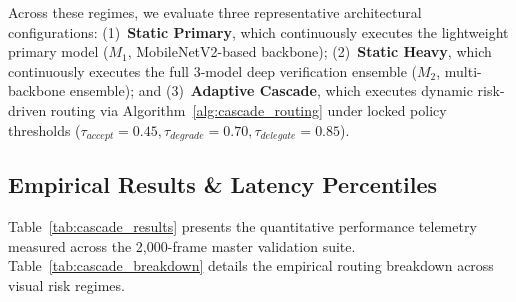 \documentclass[conference]{IEEEtran}
\begin{document}
Across these regimes, we evaluate three representative architectural configurations: (1)~\textbf{Static Primary}, which continuously executes the lightweight primary model ($M_1$, MobileNetV2-based backbone); (2)~\textbf{Static Heavy}, which continuously executes the full 3-model deep verification ensemble ($M_2$, multi-backbone ensemble); and (3)~\textbf{Adaptive Cascade}, which executes dynamic risk-driven routing via Algorithm~\ref{alg:cascade_routing} under locked policy thresholds ($\tau_{accept}=0.45, \tau_{degrade}=0.70, \tau_{delegate}=0.85$).

\subsection{Empirical Results \& Latency Percentiles}
Table~\ref{tab:cascade_results} presents the quantitative performance telemetry measured across the 2,000-frame master validation suite. Table~\ref{tab:cascade_breakdown} details the empirical routing breakdown across visual risk regimes.

\begin{table}[t]
\centering
\caption{Empirical Performance Telemetry Across Inference Architectures (2,000 Frames)}
\label{tab:cascade_results}
\end{table}
\end{document}
